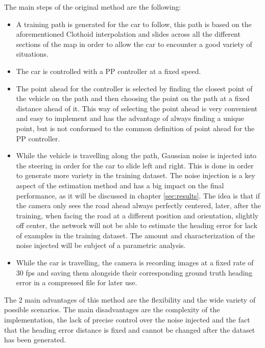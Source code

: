 \documentclass[a4paper,12pt,sort&compress]{article}
\begin{document}
The main steps of the original method are the following:
\begin{itemize}
    \item A training path is generated for the car to follow, this path is based on the
    aforementioned Clothoid interpolation and slides across all the different sections of the map in
    order to allow the car to encounter a good variety of situations.
    \item The car is controlled with a PP controller at a fixed speed. 
    \item The point ahead for the controller is selected by finding the closest point of the vehicle
    on the path and then choosing the point on the path at a fixed distance ahead of it. This way of
    selecting the point ahead is very convenient and easy to implement and has the advantage of
    always finding a unique point, but is not conformed to the common definition of point ahead for
    the PP controller. 
    \item While the vehicle is travelling along the path, Gaussian noise is injected into the
    steering in order for the car to slide left and right. This is done in order to generate more
    variety in the training dataset. The noise injection is a key aspect of the estimation method
    and has a big impact on the final performance, as it will be discussed in chapter
    \ref{sec:results}. The idea is that if the camera only sees the road ahead always perfectly
    centered, later, after the training, when facing the road at a different position and
    orientation, slightly off center, the network will not be able to estimate the heading error for
    lack of examples in the training dataset. The amount and characterization of the noise injected
    will be subject of a parametric analysis.
    \item While the car is travelling, the camera is recording images at a fixed rate of 30 fps and
    saving them alongside their corresponding ground truth heading error in a compressed file for
    later use. 
\end{itemize}
The 2 main advantages of this method are the flexibility and the wide variety of possible scenarios.
The main disadvantages are the complexity of the implementation, the lack of precise control over
the noise injected and the fact that the heading error distance is fixed and cannot be changed after
the dataset has been generated.
\end{document}
